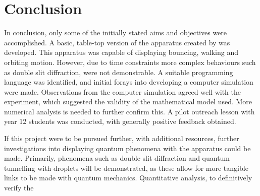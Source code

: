 \section{Conclusion}



In conclusion, only some of the initially stated aims and objectives were accomplished. A basic, table-top version of the apparatus created by \cite{couder} was developed. This apparatus was capable of displaying bouncing, walking and orbiting motion. However, due to time constraints more complex behaviours such as double slit diffraction, were not demonstrable. A suitable programming language was identified, and initial forays into developing a computer simulation were made. Observations from the computer simulation agreed well with the experiment, which suggested the validity of the mathematical model used. More numerical analysis is needed to further confirm this. A pilot outreach lesson with year 12 students was conducted, with generally positive feedback obtained. 

If this project were to be pursued further, with additional resources, further investigations into displaying quantum phenomena with the apparatus could be made. Primarily, phenomena such as double slit diffraction and quantum tunnelling with droplets will be demonstrated, as these allow for more tangible links to be made with quantum mechanics. Quantitative analysis, to definitively verify the 